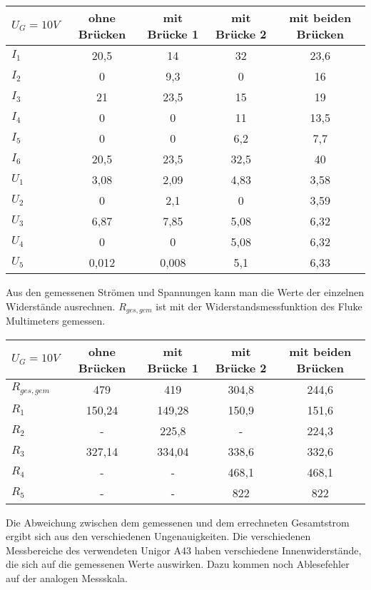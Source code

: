 \documentclass[
a4paper,     %
 headsepline, %
11pt         %
]{scrartcl}  %
\begin{document}
\begin{center}
  \begin{tabular}{ l | c | c | c | c }
    \hline
    $U_G=10V$   & ohne Brücken & mit Brücke 1 & mit Brücke 2 & mit beiden Brücken \\ \hline
    $I_1$ & 20,5 & 14   & 32   & 23,6 \\ \hline
    $I_2$ & 0    & 9,3  & 0    & 16   \\ \hline
    $I_3$ & 21   & 23,5 & 15   & 19   \\ \hline
    $I_4$ & 0    & 0    & 11   & 13,5 \\ \hline
    $I_5$ & 0    & 0    & 6,2  & 7,7  \\ \hline
    $I_6$ & 20,5 & 23,5 & 32,5 & 40   \\ \hline
    $U_1$ & 3,08 & 2,09 & 4,83 & 3,58 \\ \hline
    $U_2$ & 0    & 2,1  & 0    & 3,59 \\ \hline
    $U_3$ & 6,87 & 7,85 & 5,08 & 6,32 \\ \hline
    $U_4$ & 0    & 0    & 5,08 & 6,32 \\ \hline
    $U_5$ & 0,012 & 0,008 & 5,1 & 6,33 \\ \hline
  \end{tabular}
\end{center}
Aus den gemessenen Strömen und Spannungen kann man die Werte der einzelnen Widerstände ausrechnen.
$R_{ges,gem}$ ist mit der Widerstandsmessfunktion des Fluke Multimeters gemessen.

\begin{center}
  \begin{tabular}{ l | c | c | c | c }
    \hline
    $U_G=10V$   & ohne Brücken & mit Brücke 1 & mit Brücke 2 & mit beiden Brücken \\ \hline
    $R_{ges,gem}$ & 479    & 419    & 304,8 & 244,6 \\ \hline
    $R_{1}$   & 150,24 & 149,28 & 150,9 & 151,6 \\ \hline
    $R_{2}$   & -      & 225,8  & -     & 224,3 \\ \hline
    $R_{3}$   & 327,14 & 334,04 & 338,6 & 332,6 \\ \hline
    $R_{4}$   & -      & -      & 468,1 & 468,1 \\ \hline
    $R_{5}$   & -      & -      & 822   & 822   \\ \hline
  \end{tabular}
\end{center}

Die Abweichung zwischen dem gemessenen und dem errechneten Gesamtstrom ergibt sich aus den verschiedenen Ungenauigkeiten. 
Die verschiedenen Messbereiche des verwendeten Unigor A43 haben verschiedene Innenwiderstände, die sich auf die gemessenen Werte auswirken. 
Dazu kommen noch Ablesefehler auf der analogen Messskala.
\end{document}
